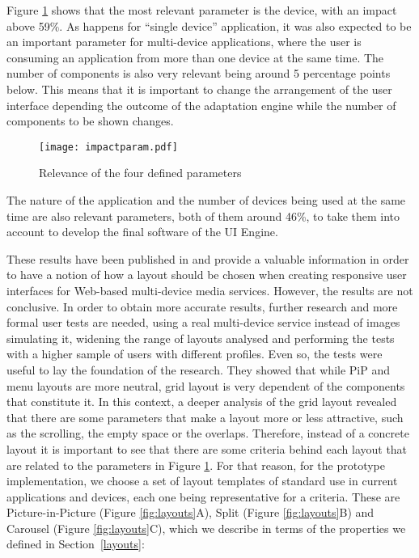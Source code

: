 Figure \ref{fig:impactparamBMSB15} shows that the most relevant parameter is the device, with an impact above 59\%. As happens for “single device” application, it was also expected to be an important parameter for multi-device applications, where the user is consuming an application from more than one device at the same time. The number of components is also very relevant being around 5 percentage points below. This means that it is important to change the arrangement of the user interface depending the outcome of the adaptation engine while the number of components to be shown changes.

\begin{figure}
	\centering
	\texttt{[image: impactparam.pdf]}
	\caption[Relevance of the four defined parameters]{Relevance of the four defined parameters}
	\label{fig:impactparamBMSB15}
\end{figure}
The nature of the application and the number of devices being used at the same time are also relevant parameters, both of them around 46\%, to take them into account to develop the final software of the UI Engine.

These results have been published in \cite{zorrilla15bmsb} and provide a valuable information in order to have a notion of how a layout should be chosen when creating responsive user interfaces for Web-based multi-device media services. However, the results are not conclusive. In order to obtain more accurate results, further research and more formal user tests are needed, using a real multi-device service instead of images simulating it, widening the range of layouts analysed and performing the tests with a higher sample of users with different profiles. Even so, the tests were useful to lay the foundation of the research. They showed that while PiP and menu layouts are more neutral, grid layout is very dependent of the components that constitute it. In this context, a deeper analysis of the grid layout revealed that there are some parameters that make a layout more or less attractive, such as the scrolling, the empty space or the overlaps. Therefore, instead of a concrete layout it is important to see that there are some criteria behind each layout that are related to the parameters in Figure \ref{fig:impactparamBMSB15}. For that reason, for the prototype implementation, we choose a set of layout templates of standard use in current applications and devices, each one being representative for a criteria. 
These are Picture-in-Picture (Figure \ref{fig:layouts}A), Split (Figure \ref{fig:layouts}B) and Carousel (Figure \ref{fig:layouts}C), which we describe in terms of the properties we defined in Section~\ref{layouts}:

